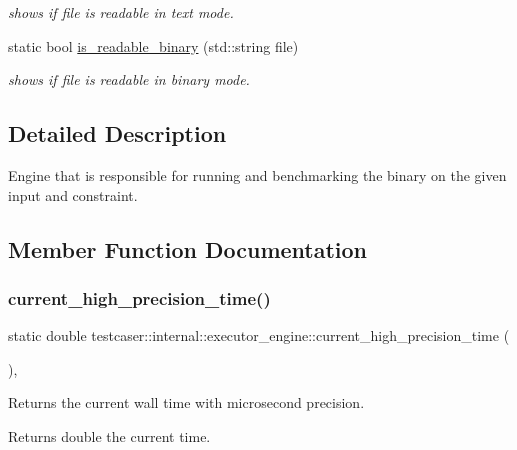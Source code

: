 \begin{DoxyCompactItemize}
\begin{DoxyCompactList}\small\item\em shows if file is readable in text mode. \end{DoxyCompactList}\item 
static bool \mbox{\hyperlink{structtestcaser_1_1internal_1_1executor__engine_ac4add5efeeecea04a65f06c5f32f62fe}{is\+\_\+readable\+\_\+binary}} (std\+::string file)
\begin{DoxyCompactList}\small\item\em shows if file is readable in binary mode. \end{DoxyCompactList}\end{DoxyCompactItemize}


\subsection{Detailed Description}
Engine that is responsible for running and benchmarking the binary on the given input and constraint. 

\subsection{Member Function Documentation}
\mbox{\label{structtestcaser_1_1internal_1_1executor__engine_af3546e4b21e46fc05bb38f014a88ed6f}} 
\subsubsection{\texorpdfstring{current\_high\_precision\_time()}{current\_high\_precision\_time()}}
{\footnotesize\ttfamily static double testcaser\+::internal\+::executor\+\_\+engine\+::current\+\_\+high\+\_\+precision\+\_\+time (\begin{DoxyParamCaption}{ }\end{DoxyParamCaption})\hspace{0.3cm}{\ttfamily [inline]}, {\ttfamily [static]}}



Returns the current wall time with microsecond precision. 

\begin{DoxyReturn}{Returns}
double the current time. 
\end{DoxyReturn}
\mbox{\label{structtestcaser_1_1internal_1_1executor__engine_a51f467bc2013c188b5e4454fa919ea70}} 
